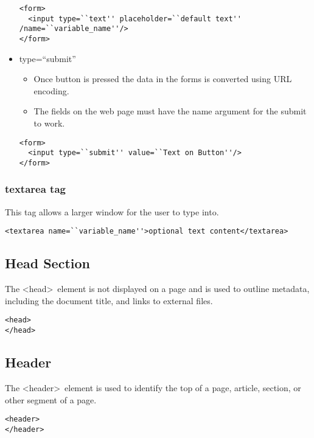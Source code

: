 \documentclass{article}
\begin{document}
\begin{itemize}
\begin{lstlisting}
<form>
  <input type=``text'' placeholder=``default text'' /name=``variable_name''/>
</form>
\end{lstlisting}

  \item type=``submit''
    \begin{itemize}
      \item Once button is pressed the data in the forms is converted using
            URL encoding.
      \item The fields on the web page must have the name argument for the
            submit to work.
    \end{itemize}
\begin{lstlisting}
<form>
  <input type=``submit'' value=``Text on Button''/>
</form>
\end{lstlisting}


\end{itemize}

\subsubsection{textarea tag}
This tag allows a larger window for the user to type into.

\begin{lstlisting}
<textarea name=``variable_name''>optional text content</textarea>
\end{lstlisting}

\subsection{Head Section}
The \textless head\textgreater \ element is not displayed on a page and is used
to outline metadata, including the document title, and links to external files.

\begin{lstlisting}
<head>
</head>
\end{lstlisting}

\subsection{Header}
The \textless header\textgreater \ element is used to identify the top of a
page, article, section, or other segment of a page.

\begin{lstlisting}
<header>
</header>
\end{lstlisting}
\end{document}
